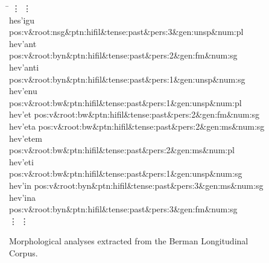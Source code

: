 \begin{figure}[t]
\begin{mdframed}
\begin{tabbing}
\hspace{1in} \= \hspace{5.5in} \kill
\vdots \> \vdots \\
hes\a'{i}gu \> pos:v\&root:nsg\&ptn:hifil\&tense:past\&pers:3\&gen:unsp\&num:pl \\
hev\a'{a}nt \> pos:v\&root:byn\&ptn:hifil\&tense:past\&pers:2\&gen:fm\&num:sg \\
hev\a'{a}nti \> pos:v\&root:byn\&ptn:hifil\&tense:past\&pers:1\&gen:unsp\&num:sg \\
hev\a'{e}nu \> pos:v\&root:bw\&ptn:hifil\&tense:past\&pers:1\&gen:unsp\&num:pl \\
hev\a'{e}t \> pos:v\&root:bw\&ptn:hifil\&tense:past\&pers:2\&gen:fm\&num:sg \\
hev\a'{e}ta \> pos:v\&root:bw\&ptn:hifil\&tense:past\&pers:2\&gen:ms\&num:sg \\
hev\a'{e}tem \> pos:v\&root:bw\&ptn:hifil\&tense:past\&pers:2\&gen:ms\&num:pl \\
hev\a'{e}ti \> pos:v\&root:bw\&ptn:hifil\&tense:past\&pers:1\&gen:unsp\&num:sg \\
hev\a'{i}n \> pos:v\&root:byn\&ptn:hifil\&tense:past\&pers:3\&gen:ms\&num:sg \\
hev\a'{i}na \> pos:v\&root:byn\&ptn:hifil\&tense:past\&pers:3\&gen:fm\&num:sg \\
\vdots \> \vdots \\
\end{tabbing}
\label{fig:analyses}
\caption{Morphological analyses extracted from the Berman Longitudinal Corpus.}
\end{mdframed}
\end{figure}





